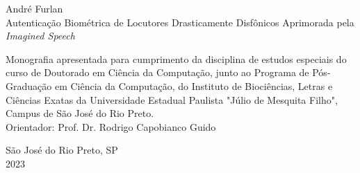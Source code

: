 \documentclass[a4paper,12pt,openright,oneside]{book}
\begin{document}
	\newpage
	\thispagestyle{empty}
	\setcounter{page}{1}
	\begin{center}
		\vspace{4cm}
		\fontsize{14}{\baselineskip} \selectfont
		\vspace{30.0pt}
		{André Furlan} \\ \vspace{30.0pt}
		{Autenticação Biométrica de Locutores Drasticamente Disfônicos Aprimorada pela \textit{Imagined Speech}} \\ \onehalfspacing \fontsize{14}{\baselineskip}
		\par \null
		\begin{flushright}
		\parbox{3.50in}{
			\fontsize{12}{\baselineskip} \selectfont \onehalfspacing
			Monografia apresentada para cumprimento da disciplina de estudos especiais do curso de Doutorado em Ciência da Computação, junto ao Programa de Pós-Graduação em Ciência da Computação, do Instituto de Biociências, Letras e Ciências Exatas da Universidade Estadual Paulista "Júlio de Mesquita Filho", Campus de São José do Rio Preto. \\ \vspace{1.0pt}
			{Orientador: Prof. Dr. Rodrigo Capobianco Guido } \\ \vspace{1.0pt}
		}
		\end{flushright}
		\fontsize{14}{\baselineskip} \selectfont
		\vspace{8.0cm}
		São José do Rio Preto, SP \\ \vspace{1.0pt}  
		2023
	\end{center}
	\newpage
	\thispagestyle{empty}
\end{document}
